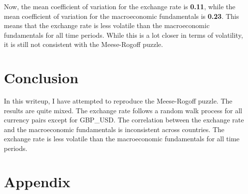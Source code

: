 \documentclass{article}
\begin{document}
Now, the mean coefficient of variation for the exchange rate is \textbf{0.11}, while the mean coefficient of variation for the macroeconomic fundamentals is \textbf{0.23}. This means that the exchange rate is less volatile than the macroeconomic fundamentals for all time periods.
While this is a lot closer in terms of volatility, it is still not consistent with the Meese-Rogoff puzzle.


\section{Conclusion}
In this writeup, I have attempted to reproduce the Meese-Rogoff puzzle. The results are quite mixed. The exchange rate follows a random walk process for all currency pairs except for GBP\_USD. The correlation between the exchange rate and the macroeconomic fundamentals is inconsistent across countries. The exchange rate is less volatile than the macroeconomic fundamentals for all time periods.\\

\newpage

\section*{Appendix}
\end{document}
